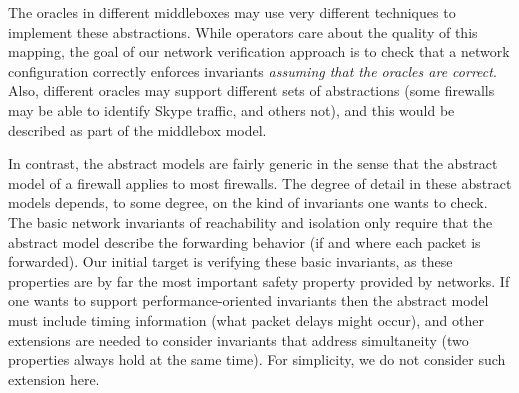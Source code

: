 The oracles in different middleboxes may use very different techniques to implement these abstractions. While operators care about the quality of this mapping, the goal of our network verification approach is to check that a network configuration correctly enforces invariants {\em assuming that the oracles are correct}. Also, different oracles may  support different sets of abstractions (\eg some firewalls may be able to identify Skype traffic, and others not), and this would be described as part of the middlebox model.

\cbstart
In contrast, the abstract models are fairly generic in the sense that the abstract model of a firewall applies to most firewalls. The degree of detail in these abstract models depends, to some degree, on the kind of invariants one wants to check.  The basic network invariants of reachability and isolation only require that the abstract model describe the forwarding behavior (\eg if and where each packet is forwarded). Our initial target is verifying these basic invariants, as these properties are by far the most important safety property provided by networks. If one wants to support performance-oriented invariants then the abstract model must include timing information (\eg what packet delays might occur), and other extensions are needed to consider invariants that address simultaneity (two properties always hold at the same time). For simplicity, we do not consider such extension here.
\cbend

